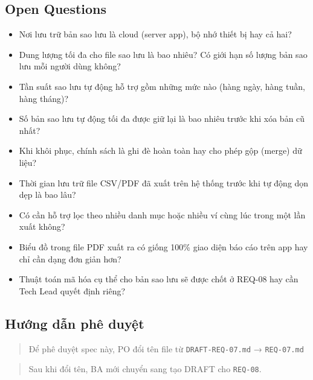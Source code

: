 \subsection{Open Questions}

\begin{itemize}
\item [ ] Nơi lưu trữ bản sao lưu là cloud (server app), bộ nhớ thiết bị hay cả hai?
\item [ ] Dung lượng tối đa cho file sao lưu là bao nhiêu? Có giới hạn số lượng bản sao lưu mỗi người dùng không?
\item [ ] Tần suất sao lưu tự động hỗ trợ gồm những mức nào (hàng ngày, hàng tuần, hàng tháng)?
\item [ ] Số bản sao lưu tự động tối đa được giữ lại là bao nhiêu trước khi xóa bản cũ nhất?
\item [ ] Khi khôi phục, chính sách là ghi đè hoàn toàn hay cho phép gộp (merge) dữ liệu?
\item [ ] Thời gian lưu trữ file CSV/PDF đã xuất trên hệ thống trước khi tự động dọn dẹp là bao lâu?
\item [ ] Có cần hỗ trợ lọc theo nhiều danh mục hoặc nhiều ví cùng lúc trong một lần xuất không?
\item [ ] Biểu đồ trong file PDF xuất ra có giống 100\% giao diện báo cáo trên app hay chỉ cần dạng đơn giản hơn?
\item [ ] Thuật toán mã hóa cụ thể cho bản sao lưu sẽ được chốt ở REQ-08 hay cần Tech Lead quyết định riêng?
\end{itemize}
\subsection{Hướng dẫn phê duyệt}

\begin{quote}
Để phê duyệt spec này, PO đổi tên file từ \texttt{DRAFT-REQ-07.md} → \texttt{REQ-07.md}
\end{quote}

\begin{quote}
Sau khi đổi tên, BA mới chuyển sang tạo DRAFT cho \texttt{REQ-08}.
\end{quote}
